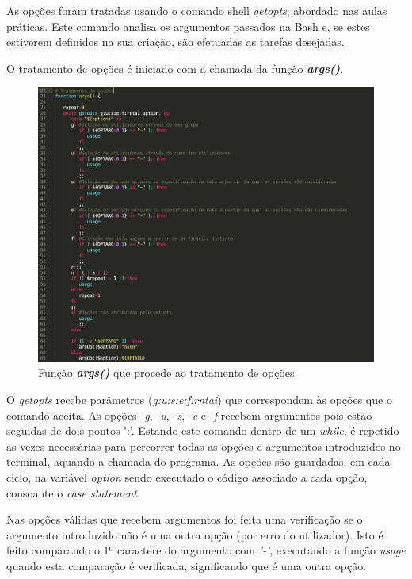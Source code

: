 \documentclass[10pt,portuguese]{article}
\begin{document}
\par As opções foram tratadas usando o comando shell \textit{getopts}, abordado nas aulas práticas. Este comando analisa os argumentos passados na Bash e, se estes estiverem definidos na sua criação, são efetuadas as tarefas desejadas.
\newline
\par O tratamento de opções é iniciado com a chamada da função \textbf{\textit{args()}}.
\begin{figure}[!h]
    \centering
    \includegraphics[width=\textwidth]{getopts.png}
    \caption{Função \textbf{\textit{args()}} que procede ao tratamento de opções}
\end{figure}
\par O \textit{getopts} recebe parâmetros (\textit{g:u:s:e:f:rntai}) que correspondem às opções que o comando aceita. As opções \textit{-g}, \textit{-u}, \textit{-s}, \textit{-e} e \textit{-f} recebem argumentos pois estão seguidas de dois pontos ':'. Estando este comando dentro de um \textit{while}, é repetido as vezes necessárias para percorrer todas as opções e argumentos introduzidos no terminal, aquando a chamada do programa. As opções são guardadas, em cada ciclo, na variável \textit{option} sendo executado o código associado a cada opção, consoante o \textit{case statement}.
\par Nas opções válidas que recebem argumentos foi feita uma verificação se o argumento introduzido não é uma outra opção (por erro do utilizador). Isto é feito comparando o 1º caractere do argumento com \textit{'-'}, executando a função \textit{usage} quando esta comparação é verificada, significando que é uma outra opção.
\end{document}
